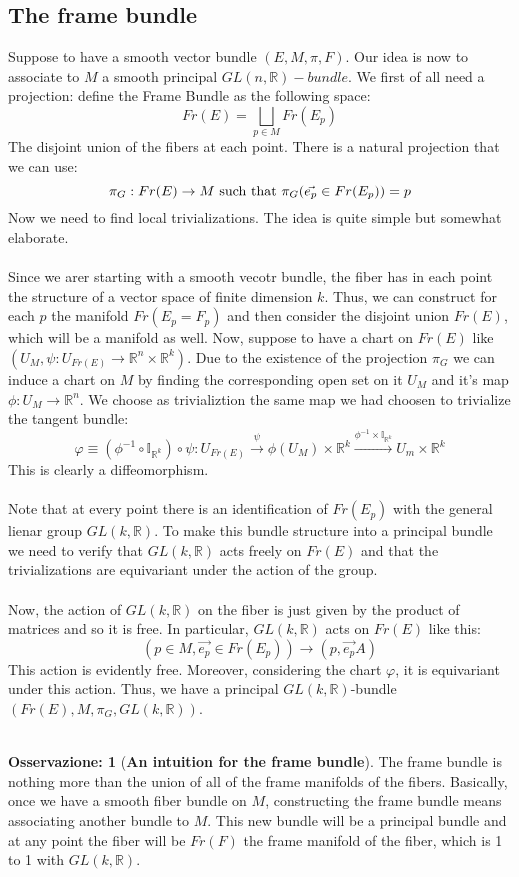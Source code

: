 \documentclass[12pt,a4paper]{report}
\theoremstyle{definition}
\theoremstyle{Theorem}
\theoremstyle{definition}
\theoremstyle{definition}
\theoremstyle{definition}
\newtheorem{Obs}[Def]{Osservazione:}
\begin{document}
		\subsection{The frame bundle}
		Suppose to have a smooth vector bundle $(E,M,\pi,F)$. Our idea is now to associate to $M$ a smooth principal $GL(n,\mathbb{R})-bundle$. We first of all need a projection: define the Frame Bundle as the following space:
		$$Fr(E)=\bigsqcup_{p\in M}Fr(E_p)$$
		The disjoint union of the fibers at each point. There is a natural projection that we can use:
		$$\pi_G:Fr(E)\rightarrow M\hbox{ such that } \pi_G(\vec{e_p}\in Fr(E_p))=p$$
		Now we need to find local trivializations. The idea is quite simple but somewhat elaborate.\\
		\\
		Since we arer starting with a smooth vecotr bundle, the fiber has in each point the structure of a vector space of finite dimension $k$. Thus, we can construct for each $p$ the manifold $Fr(E_p=F_p)$ and then consider the disjoint union $Fr(E)$, which will be a manifold as well. Now, suppose to have a chart on $Fr(E)$ like $(U_{M},\psi:U_{Fr(E)}\rightarrow \mathbb{R}^n\times\mathbb{R}^k)$. Due to the existence of the projection $\pi_G$ we can induce a chart on $M$ by finding the corresponding open set on it $U_M$ and it's map $\phi:U_M\rightarrow \mathbb{R}^n$. We choose as trivializtion the same map we had choosen to trivialize the tangent bundle:
		$$\varphi\equiv(\phi^{-1}\circ \mathbb{I}_{\mathbb{R}^k})\circ \psi: U_{Fr(E)}\xrightarrow{\psi}\phi(U_M)\times\mathbb{R}^k\xrightarrow{\phi^{-1}\times\mathbb{I}_{\mathbb{R}^k}}U_m\times\mathbb{R}^k$$
		This is clearly a diffeomorphism.\\
		\\
		Note that at every point there is an identification of $Fr(E_p)$ with the general lienar group $GL(k,\mathbb{R})$. To make this bundle structure into a principal bundle we need to verify that $GL(k,\mathbb{R})$ acts freely on $Fr(E)$ and that the trivializations are equivariant under the action of the group.\\
		\\
		Now, the action of $GL(k,\mathbb{R})$ on the fiber is just given by the product of matrices and so it is free. In particular, $GL(k,\mathbb{R})$ acts on $Fr(E)$ like this:
		$$(p\in M,\vec{e_p}\in Fr(E_p))\longrightarrow(p,\vec{e_p}A)$$
		This action is evidently free. Moreover, considering the chart $\varphi$, it is equivariant under this action. Thus, we have a principal $GL(k,\mathbb{R})$-bundle $(Fr(E),M,\pi_G,GL(k,\mathbb{R}))$.\\
		\\
		\begin{Obs} [\textbf{An intuition for the frame bundle}]
			The frame bundle is nothing more than the union of all of the frame manifolds of the fibers. Basically, once we have a smooth fiber bundle on $M$, constructing the frame bundle means associating another bundle to $M$. This new bundle will be a principal bundle and at any point the fiber will be $Fr(F)$ the frame manifold of the fiber, which is 1 to 1 with $GL(k,\mathbb{R})$.
		\end{Obs}
\end{document}
